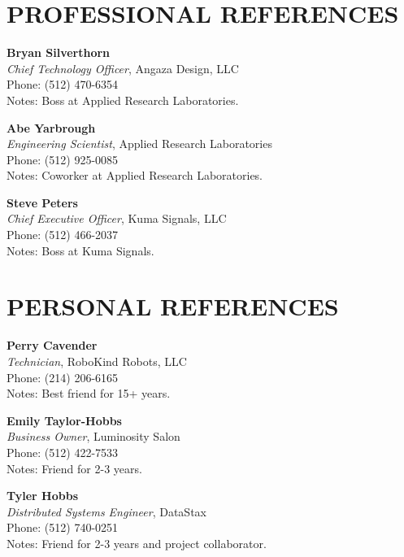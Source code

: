\documentclass[line,margin=1in]{res}
\begin{document}
\address{40 N IH35 APT 10D2, Austin, Texas 78701}
\address{(512) 237-7562 \\ \url{jonstarr@utexas.edu}}
 
\begin{resume}

\section{PROFESSIONAL REFERENCES}
\vspace*{\baselineskip}

{\bf Bryan Silverthorn} \\
{\sl Chief Technology Officer}, Angaza Design, LLC \\
Phone: (512) 470-6354 \\
Notes: Boss at Applied Research Laboratories.

{\bf Abe Yarbrough} \\
{\sl Engineering Scientist}, Applied Research Laboratories \\
Phone: (512) 925-0085 \\
Notes: Coworker at Applied Research Laboratories.

{\bf Steve Peters} \\
{\sl Chief Executive Officer}, Kuma Signals, LLC \\
Phone: (512) 466-2037 \\
Notes: Boss at Kuma Signals.

\section{PERSONAL REFERENCES}
\vspace*{\baselineskip}

{\bf Perry Cavender} \\
{\sl Technician}, RoboKind Robots, LLC \\
Phone: (214) 206-6165 \\
Notes: Best friend for 15+ years.

{\bf Emily Taylor-Hobbs} \\
{\sl Business Owner}, Luminosity Salon \\
Phone: (512) 422-7533 \\
Notes: Friend for 2-3 years.

{\bf Tyler Hobbs} \\
{\sl Distributed Systems Engineer}, DataStax \\
Phone: (512) 740-0251 \\
Notes: Friend for 2-3 years and project collaborator.

\end{resume}
\end{document}
